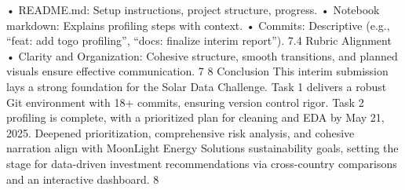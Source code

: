 • README.md: Setup instructions, project structure, progress.
• Notebook markdown: Explains profiling steps with context.
• Commits: Descriptive (e.g., “feat: add togo profiling”, “docs: finalize interim report”).
7.4 Rubric Alignment
• Clarity and Organization: Cohesive structure, smooth transitions, and planned visuals
ensure effective communication.
7
8 Conclusion
This interim submission lays a strong foundation for the Solar Data Challenge. Task 1 delivers
a robust Git environment with 18+ commits, ensuring version control rigor. Task 2 profiling
is complete, with a prioritized plan for cleaning and EDA by May 21, 2025. Deepened prioritization, comprehensive risk analysis, and cohesive narration align with MoonLight Energy
Solutions sustainability goals, setting the stage for data-driven investment recommendations
via cross-country comparisons and an interactive dashboard.
8
